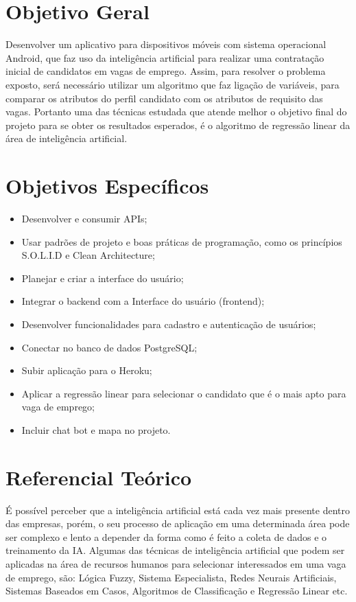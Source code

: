 \documentclass[conference]{IEEEtran}
\begin{document}
\section{Objetivo Geral}
Desenvolver um aplicativo para dispositivos móveis com sistema operacional Android, que faz uso da inteligência artificial para realizar uma contratação inicial de candidatos em vagas de emprego. Assim, para resolver o problema exposto, será necessário utilizar um algoritmo que faz ligação de variáveis, para comparar os atributos do perfil candidato com os atributos de requisito das vagas. Portanto uma das técnicas estudada que atende melhor o objetivo final do projeto para se obter os resultados esperados, é o algoritmo de regressão linear da área de inteligência artificial.

\section{Objetivos Específicos}
\begin{itemize}
\item Desenvolver e consumir APIs; 
\item Usar padrões de projeto e boas práticas de programação, como os princípios S.O.L.I.D e Clean Architecture; 
\item Planejar e criar a interface do usuário;
\item Integrar o backend com a Interface do usuário (frontend); 
\item Desenvolver funcionalidades para cadastro e autenticação de usuários;
\item Conectar no banco de dados PostgreSQL;
\item Subir aplicação para o Heroku;
\item Aplicar a regressão linear para selecionar o candidato que é o mais apto para vaga de emprego;
\item Incluir chat bot e mapa no projeto.
\end{itemize}

\section{Referencial Teórico}
É possível perceber que a inteligência artificial está cada vez mais presente dentro das empresas, porém, o seu processo de aplicação em uma determinada área pode ser complexo e lento a depender da forma como é feito a coleta de dados e o treinamento da IA. Algumas das técnicas de inteligência artificial que podem ser aplicadas na área de recursos humanos para selecionar interessados em uma vaga de emprego, são: Lógica Fuzzy, Sistema Especialista, Redes Neurais Artificiais, Sistemas Baseados em Casos, Algoritmos de Classificação e Regressão Linear etc.
\end{document}
